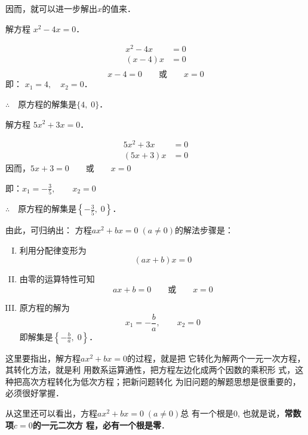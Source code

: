 因而，就可以进一步解出$x$的值来．

\begin{example}
    解方程 $x^2-4x=0$．    
\end{example}

\begin{solution}
    \begin{align*}
        x^2-4x&=0\\
        (x-4)x&=0\tag{分配律}\\
    \end{align*}
\[x-4=0\qquad \text{或}\qquad x=0\]
即： $x_1=4,\quad x_2=0$．

$\therefore\quad $原方程的解集是$\{4,\; 0\}$．
\end{solution}



\begin{example}
    解方程
$5x^2+3x=0$．
\end{example}

\begin{solution}
\begin{align*}
    5x^2+3x&=0\\
    (5x+3)x&=0
\end{align*}  
因而，$5x+3=0\qquad \text{或}\qquad x=0$

即：$x_1=-\frac{3}{5},\qquad x_2=0$

$\therefore\quad $原方程的解集是$\left\{-\frac{3}{5},\; 0\right\}$．
\end{solution}

由此，可归纳出：
方程$ax^2+bx=0\; (a\ne 0)$的解法步骤是：

\begin{blk}{}
\begin{enumerate}[I. ]
    \item 利用分配律变形为
    $$(ax+b)x=0$$
    \item 由零的运算特性可知
    $$ax+b=0\qquad  \text{或}\qquad x=0$$
    \item 原方程的解为
    $$x_1=-\frac{b}{a},\qquad x_2=0$$
    即解集是$\left\{-\frac{b}{a},\; 0\right\}$．
\end{enumerate}
\end{blk}

这里要指出，解方程$ax^2+bx=0$的过程，就是把
它转化为解两个一元一次方程，其转化方法，就是利
用数系运算通性，把方程左边化成两个因数的乘积形
式，这种把高次方程转化为低次方程；把新问题转化
为旧问题的解题思想是很重要的，必须很好掌握．

从这里还可以看出，方程$ax^2+bx=0\; (a\ne 0)$总
有一个根是0, 也就是说，\textbf{常数项$c=0$的一元二次方
程，必有一个根是零}．

